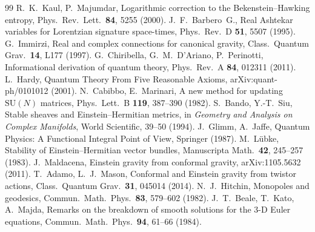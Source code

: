 \documentclass[11pt,a4paper]{article}
\theoremstyle{definition}
\theoremstyle{remark}
\newcommand{\SU}{\mathrm{SU}}
\begin{document}
\begin{thebibliography}{99}
 R.~K.~Kaul, P.~Majumdar, Logarithmic correction to the Bekenstein--Hawking entropy, Phys.\ Rev.\ Lett.\ \textbf{84}, 5255 (2000).
 J.~F.~Barbero~G., Real Ashtekar variables for Lorentzian signature space-times, Phys.\ Rev.\ D \textbf{51}, 5507 (1995).
 G.~Immirzi, Real and complex connections for canonical gravity, Class.\ Quantum Grav.\ \textbf{14}, L177 (1997).
 G.~Chiribella, G.~M.~D'Ariano, P.~Perinotti, Informational derivation of quantum theory, Phys.\ Rev.\ A \textbf{84}, 012311 (2011).
 L.~Hardy, Quantum Theory From Five Reasonable Axioms, arXiv:quant-ph/0101012 (2001).
 N.~Cabibbo, E.~Marinari, A new method for updating $\SU(N)$ matrices, Phys.\ Lett.\ B \textbf{119}, 387--390 (1982).
 S.~Bando, Y.-T.~Siu, Stable sheaves and Einstein--Hermitian metrics, in \emph{Geometry and Analysis on Complex Manifolds}, World Scientific, 39--50 (1994).
 J.~Glimm, A.~Jaffe, Quantum Physics: A Functional Integral Point of View, Springer (1987).
 M.~L\"ubke, Stability of Einstein--Hermitian vector bundles, Manuscripta Math.\ \textbf{42}, 245--257 (1983).
 J.~Maldacena, Einstein gravity from conformal gravity, arXiv:1105.5632 (2011).
 T.~Adamo, L.~J.~Mason, Conformal and Einstein gravity from twistor actions, Class.\ Quantum Grav.\ \textbf{31}, 045014 (2014).
 N.~J.~Hitchin, Monopoles and geodesics, Commun.\ Math.\ Phys.\ \textbf{83}, 579--602 (1982).
 J.~T.~Beale, T.~Kato, A.~Majda, Remarks on the breakdown of smooth solutions for the $3$-D Euler equations, Commun.\ Math.\ Phys.\ \textbf{94}, 61--66 (1984).

\end{thebibliography}
\end{document}
